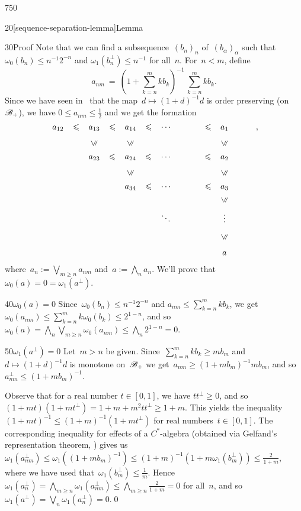 \begin{parsec}{750}
\begin{point}{20}[sequence-separation-lemma]{Lemma}
\begin{point}{30}{Proof}
Note that we can find a subsequence~$(b_n)_n$ of~$(b_\alpha)_\alpha$
such that $\omega_0( b_n ) 
	\leq n^{-1}2^{-n}$
and $\omega_1(b_n^\perp)\leq n^{-1}$
for all~$n$.
For~$n < m$, define
\begin{equation*}
\textstyle
a_{nm}\ = \ (1+\sum_{k=n}^m kb_k)^{-1} \,\sum_{k=n}^m kb_k.
\end{equation*}
Since we have seen in~
that the map~$d\mapsto (1+d)^{-1}d$ is order preserving
(on~$\mathscr{B}_{+}$),
we have $0\leq a_{nm}\leq \frac{1}{2}$
and we get the formation
\begin{equation*}
\renewcommand{\labelstyle}{\textstyle}
\xymatrix{
a_{12}\ar@{}|-{\leq}[r] & 
a_{13}\ar@{}|-{\leq}[r] & 
a_{14}\ar@{}|-{\leq}[r]  & 
\dotsb & \ar@{}|-{\leq}[r]& a_1 \\
&
a_{23} \ar@{}|-{\leq}[r] \ar@{}[u]|-{\uleq} &
a_{24} \ar@{}|-{\leq}[r]  \ar@{}[u]|-{\uleq} &
\dotsb &\ar@{}|-{\leq}[r]& a_2  \ar@{}[u]|-{\uleq} \\
&
&
a_{34} \ar@{}|-{\leq}[r]  \ar@{}[u]|-{\uleq} & 
\dotsb & \ar@{}|-{\leq}[r] & a_3  \ar@{}[u]|-{\uleq} 
\\
&&&\ddots&&\vdots \ar@{}[u]|-{\uleq}& \\
&&&&&a\ar@{}[u]|-{\uleq}
},
\end{equation*}
where~$a_n:= \bigvee_{m\geq n} a_{nm}$
and~$a := \bigwedge_n a_n$.
We'll prove that~$\omega_0(a)=0=\omega_1(a^\perp)$.
\begin{point}{40}{$\omega_0(a)=0$}%
	Since~$\omega_0(b_n)\leq n^{-1}2^{-n}$ 
and $a_{nm}\leq \sum_{k=n}^m k b_k$,
we get~$\omega_0(a_{nm})\leq \sum_{k=n}^m k\omega_0(b_k) \leq 2^{1-n}$,
and so $\omega_0(a)=\bigwedge_n\bigvee_{m\geq n} \omega_0(a_{nm})
\leq \bigwedge_n 2^{1-n} = 0$.
\end{point}
\begin{point}{50}{$\omega_1(a^\perp )=0$}%
Let~$m> n$ be given.
Since~$\sum_{k=n}^m kb_k \geq mb_m$
and $d\mapsto (1+d)^{-1}d$
is monotone on~$\mathscr{B}_{+}$
we get~$a_{nm} \geq (1+mb_m)^{-1} mb_m$,
and so~$a_{nm}^\perp \leq (1+mb_m)^{-1}$.

Observe that for a real number $t\in[0,1]$,
we have $tt^\perp \geq 0$,
and so $(1+mt)(1+mt^\perp) = 1+m+m^2tt^\perp \geq 1+m$.
This yields the inequality $(1+mt)^{-1}\leq (1+m)^{-1}(1+mt^\perp)$
for real numbers~$t\in[0,1]$.
The corresponding inequality for effects of a $C^*$-algebra
(obtained via Gelfand's representation theorem, )
gives us $\omega_1(a_{nm}^\perp)\leq \omega_1((1+mb_m)^{-1})
\leq (1+m)^{-1}(1+m\omega_1(b_m^\perp))\leq \frac{2}{1+m}$,
where we have used that~$\omega_1(b_m^\perp)\leq \frac{1}{m}$.
Hence~$\omega_1(a_n^\perp)=\bigwedge_{m\geq n} \omega_1(a_{nm}^\perp)
\leq \bigwedge_{m\geq n} \frac{2}{1+m}=0$ for all~$n$,
and so~$\omega_1(a^\perp)=\bigvee_n\omega_1(a_n^\perp)=0$.\qed
\end{point}
\end{point}



\end{point}
\end{parsec}
